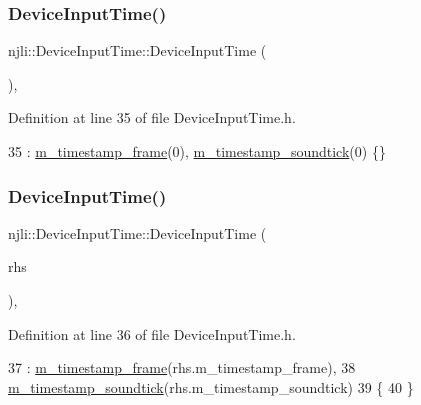 \subsubsection{\texorpdfstring{Device\+Input\+Time()}{DeviceInputTime()}\hspace{0.1cm}{\footnotesize\ttfamily [1/2]}}
{\footnotesize\ttfamily njli\+::\+Device\+Input\+Time\+::\+Device\+Input\+Time (\begin{DoxyParamCaption}{ }\end{DoxyParamCaption})\hspace{0.3cm}{\ttfamily [inline]}, {\ttfamily [protected]}}



Definition at line 35 of file Device\+Input\+Time.\+h.


\begin{DoxyCode}
35 : \mbox{\hyperlink{classnjli_1_1_device_input_time_a798d29d739522cad83bd37986ed15a20}{m\_timestamp\_frame}}(0), \mbox{\hyperlink{classnjli_1_1_device_input_time_a20e05f326dd3a3836a549cba6b536e85}{m\_timestamp\_soundtick}}(0) \{\}
\end{DoxyCode}
\mbox{\label{classnjli_1_1_device_input_time_af34c8fdf7626c83b3a106984c6218332}} 
\subsubsection{\texorpdfstring{Device\+Input\+Time()}{DeviceInputTime()}\hspace{0.1cm}{\footnotesize\ttfamily [2/2]}}
{\footnotesize\ttfamily njli\+::\+Device\+Input\+Time\+::\+Device\+Input\+Time (\begin{DoxyParamCaption}\item[{const \mbox{\hyperlink{classnjli_1_1_device_input_time}{Device\+Input\+Time}} \&}]{rhs }\end{DoxyParamCaption})\hspace{0.3cm}{\ttfamily [inline]}, {\ttfamily [protected]}}



Definition at line 36 of file Device\+Input\+Time.\+h.


\begin{DoxyCode}
37         : \mbox{\hyperlink{classnjli_1_1_device_input_time_a798d29d739522cad83bd37986ed15a20}{m\_timestamp\_frame}}(rhs.m\_timestamp\_frame),
38           \mbox{\hyperlink{classnjli_1_1_device_input_time_a20e05f326dd3a3836a549cba6b536e85}{m\_timestamp\_soundtick}}(rhs.m\_timestamp\_soundtick)
39     \{
40     \}
\end{DoxyCode}
\mbox{\label{classnjli_1_1_device_input_time_a2c421a428c0d4fdc1311d91b7001f9fc}} 
